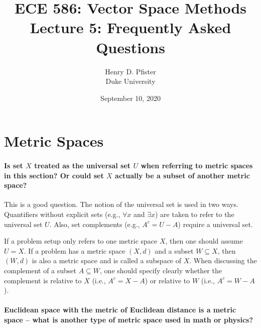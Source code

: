 \documentclass[10pt,english]{article}
\begin{document}
\title{ECE 586: Vector Space Methods \\ Lecture 5: Frequently Asked Questions}
\author{Henry D. Pfister \\ Duke University}
\date{September 10, 2020}

\maketitle

\section{Metric Spaces}

\paragraph{Is set $X$ treated as the universal set $U$ when referring to metric spaces in this section? Or could set $X$ actually be a subset of another metric space?}

This is a good question.
The notion of the universal set is used in two ways.
Quantifiers without explicit sets (e.g., $\forall x$ and $\exists x$) are taken to refer to the universal set $U$.
Also, set complements (e.g.,  $A^c = U - A$) require a universal set.

If a problem setup only refers to one metric space $X$, then one should assume $U=X$.
If a problem has a metric space $(X,d)$ and a subset $W \subseteq X$, then $(W,d)$ is also a metric space and is called a subspace of $X$.
When discussing the complement of a subset $A \subseteq W$, one should specify clearly whether the complement is relative to $X$ (i.e., $A^c = X-A$) or relative to $W$ (i.e., $A^c = W-A$).


\paragraph{Euclidean space with the metric of Euclidean distance is a metric space -- what is another type of metric space used in math or physics?} %
\end{document}
